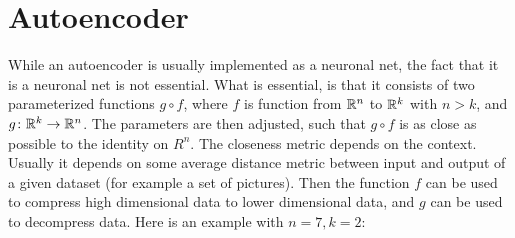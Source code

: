 \section{Autoencoder}\label{appx:autoencoder}
While an autoencoder is usually implemented as a neuronal net, the fact that it is a neuronal net is not essential. What is essential, is that it consists of two parameterized functions \(g\circ f\), where \(f\) is function from \(\mathbb{R}^n\) to \(\mathbb{R}^k\) with \(n>k\), and \(g\colon \mathbb{R}^k\to\mathbb{R}^n\). The parameters are then adjusted, such that \(g\circ f\) is as close as possible to the identity on \(R^n\). The closeness metric depends on the context. Usually it depends on some average distance metric between input and output of a given dataset (for example a set of pictures). Then the function \(f\) can be used to compress high dimensional data to lower dimensional data, and \(g\) can be used to decompress data.
Here is an example with \(n=7,k=2\):

\def\layersep{2.5cm}

